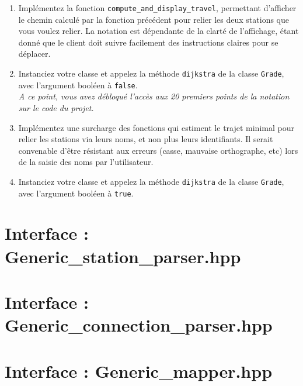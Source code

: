 \documentclass[9pts]{article}
\renewcommand{\ttdefault}{cmtt}
\begin{document}
\begin{enumerate}
\item Implémentez la fonction \texttt{compute\_and\_display\_travel}, permettant d'afficher le chemin calculé par la fonction précédent pour relier les deux stations que vous voulez relier. La notation est dépendante de la clarté de l'affichage, étant donné que le client doit suivre facilement des instructions claires pour se déplacer.
\item Instanciez votre classe et appelez la méthode \texttt{dijkstra} de la classe \texttt{Grade}, avec l'argument booléen à \texttt{false}.\\

\emph{A ce point, vous avez débloqué l'accès aux 20 premiers points de la notation sur le code du projet.}\\

\item Implémentez une surcharge des fonctions qui estiment le trajet minimal pour relier les stations via leurs noms, et non plus leurs identifiants. Il serait convenable d'être résistant aux erreurs (casse, mauvaise orthographe, etc) lors de la saisie des noms par l'utilisateur.

\item Instanciez votre classe et appelez la méthode \texttt{dijkstra} de la classe \texttt{Grade}, avec l'argument booléen à \texttt{true}.
\end{enumerate}

\appendix
\clearpage

\renewcommand{\ttdefault}{zi4}

\section{Interface : Generic\_station\_parser.hpp}

\section{Interface : Generic\_connection\_parser.hpp}

\section{Interface : Generic\_mapper.hpp}

\end{document}
